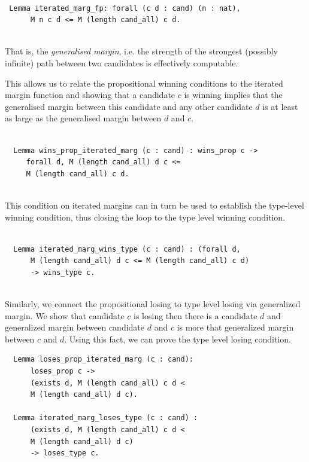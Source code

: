 \begin{verbatim}

 Lemma iterated_marg_fp: forall (c d : cand) (n : nat),
      M n c d <= M (length cand_all) c d.
      
\end{verbatim}


\noindent
That is, the \emph{generalised margin}, i.e. the strength of the strongest (possibly infinite) path
between two candidates is effectively computable.

This allows us to relate the propositional winning conditions to the
iterated margin function and showing that a candidate $c$ is winning
implies that the generalised margin between this candidate and any
other candidate $d$ is at least as large as the generalised margin between $d$
and $c$.

\begin{verbatim}

  Lemma wins_prop_iterated_marg (c : cand) : wins_prop c ->
     forall d, M (length cand_all) d c <=  
     M (length cand_all) c d.
                   
\end{verbatim}

\noindent
This condition on iterated margins can in turn be used to establish the
type-level winning condition, thus closing the loop to the type
level winning condition.

\begin{verbatim}

  Lemma iterated_marg_wins_type (c : cand) : (forall d,
      M (length cand_all) d c <= M (length cand_all) c d) 
      -> wins_type c.
      
\end{verbatim}

Similarly, we connect the propositional losing to type level losing via generalized margin. We show that 
candidate $c$ is losing then there is a candidate $d$ and generalized margin between candidate $d$ and 
$c$ is more that generalized margin between $c$ and $d$.  Using this fact, we can prove the 
type level losing condition. 

\begin{verbatim} 
  Lemma loses_prop_iterated_marg (c : cand):
      loses_prop c ->
      (exists d, M (length cand_all) c d < 
      M (length cand_all) d c).

  Lemma iterated_marg_loses_type (c : cand) :
      (exists d, M (length cand_all) c d < 
      M (length cand_all) d c) 
      -> loses_type c.
\end{verbatim}



